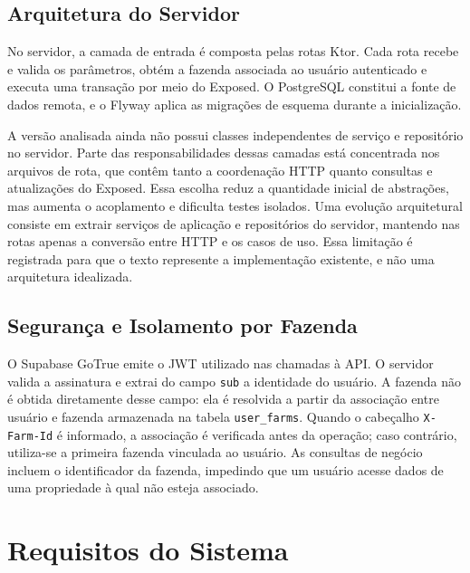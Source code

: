 \subsection{Arquitetura do Servidor}
\label{subsec:arquitetura-servidor}

No servidor, a camada de entrada é composta pelas rotas Ktor. Cada rota recebe e valida os parâmetros, obtém a fazenda associada ao usuário autenticado e executa uma transação por meio do Exposed. O PostgreSQL constitui a fonte de dados remota, e o Flyway aplica as migrações de esquema durante a inicialização.

A versão analisada ainda não possui classes independentes de serviço e repositório no servidor. Parte das responsabilidades dessas camadas está concentrada nos arquivos de rota, que contêm tanto a coordenação HTTP quanto consultas e atualizações do Exposed. Essa escolha reduz a quantidade inicial de abstrações, mas aumenta o acoplamento e dificulta testes isolados. Uma evolução arquitetural consiste em extrair serviços de aplicação e repositórios do servidor, mantendo nas rotas apenas a conversão entre HTTP e os casos de uso. Essa limitação é registrada para que o texto represente a implementação existente, e não uma arquitetura idealizada.

\subsection{Segurança e Isolamento por Fazenda}
\label{subsec:arquitetura-seguranca}

O Supabase GoTrue emite o JWT utilizado nas chamadas à API. O servidor valida a assinatura e extrai do campo \texttt{sub} a identidade do usuário. A fazenda não é obtida diretamente desse campo: ela é resolvida a partir da associação entre usuário e fazenda armazenada na tabela \texttt{user\_farms}. Quando o cabeçalho \texttt{X-Farm-Id} é informado, a associação é verificada antes da operação; caso contrário, utiliza-se a primeira fazenda vinculada ao usuário. As consultas de negócio incluem o identificador da fazenda, impedindo que um usuário acesse dados de uma propriedade à qual não esteja associado.

\section{Requisitos do Sistema}
\label{sec:desenvolvimento-requisitos}

